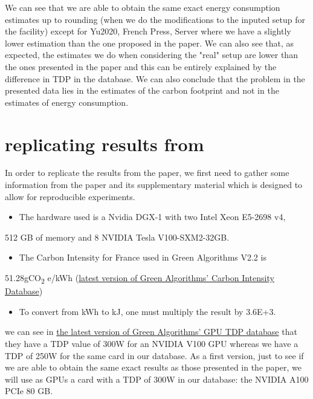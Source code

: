 \documentclass[11pt]{article}
\begin{document}
We can see that we are able to obtain the same exact energy consumption
estimates up to rounding (when we do the modifications to the inputed setup for the
facility) except for Yu2020, French Press, Server where we have a
slightly lower estimation than the one proposed in the paper.
We can also see that, as expected, the estimates we do when
considering the "real" setup are lower than the ones presented in the
paper and this can be entirely explained by the difference in TDP in
the database.
We can also conclude that the problem in the presented data lies in
the estimates of the carbon footprint and not in the estimates of
energy consumption.


\section{replicating results from \cite{Jay2023experimental}}
\label{sec:orgac296c2}

In order to replicate the results from the paper, we first need to
gather some information from the paper and its supplementary material
which is designed to allow for reproducible experiments.

\begin{itemize}
\item The hardware used is a Nvidia DGX-1 with two Intel Xeon E5-2698 v4,
\end{itemize}
512 GB of memory and 8 NVIDIA Tesla V100-SXM2-32GB. 

\begin{itemize}
\item The Carbon Intensity for France used in Green Algorithms V2.2 is
\end{itemize}
51.28gCO\textsubscript{2} e/kWh (\href{https://github.com/GreenAlgorithms/green-algorithms-tool/blob/master/data/latest/CI\_aggregated.csv}{latest version of Green Algorithms' Carbon Intensity
Database})

\begin{itemize}
\item To convert from kWh to kJ, one must multiply the result by 3.6E+3.
\end{itemize}

we can see in \href{https://github.com/GreenAlgorithms/green-algorithms-tool/blob/master/data/latest/TDP\_gpu.csv}{the latest version of Green Algorithms' GPU TDP database}
that they have a TDP value of 300W for an NVIDIA V100 GPU whereas we
have a TDP of 250W for the same card in our database. As a first
version, just to see if we are able to obtain the same exact results
as those presented in the paper, we will use as GPUs a card with a TDP
of 300W in our database: the NVIDIA A100 PCIe 80 GB.
\end{document}
